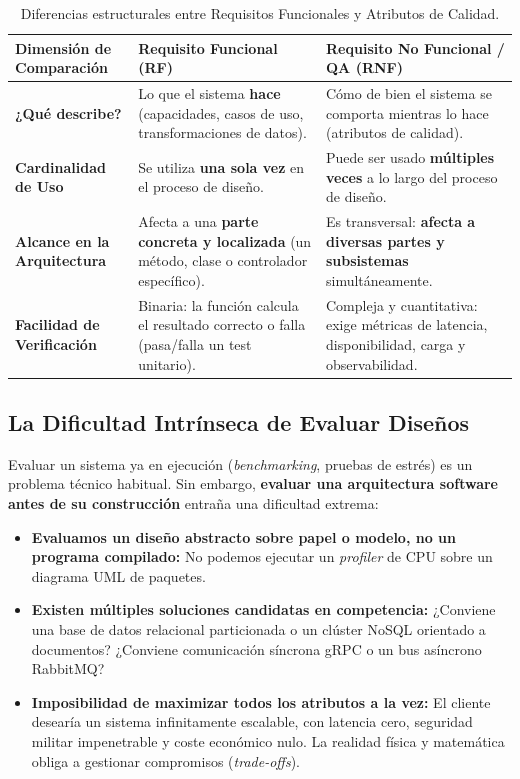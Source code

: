 \begin{table}[htbp]
\centering
\small
\begin{tabularx}{\textwidth}{p{4.5cm} X X}
\toprule
\textbf{Dimensión de Comparación} & \textbf{Requisito Funcional (RF)} & \textbf{Requisito No Funcional / QA (RNF)} \\
\midrule
\textbf{¿Qué describe?} & Lo que el sistema \textbf{hace} (capacidades, casos de uso, transformaciones de datos). & Cómo de bien el sistema se comporta mientras lo hace (atributos de calidad). \\
\addlinespace
\textbf{Cardinalidad de Uso} & Se utiliza \textbf{una sola vez} en el proceso de diseño. & Puede ser usado \textbf{múltiples veces} a lo largo del proceso de diseño. \\
\addlinespace
\textbf{Alcance en la Arquitectura} & Afecta a una \textbf{parte concreta y localizada} (un método, clase o controlador específico). & Es transversal: \textbf{afecta a diversas partes y subsistemas} simultáneamente. \\
\addlinespace
\textbf{Facilidad de Verificación} & Binaria: la función calcula el resultado correcto o falla (pasa/falla un test unitario). & Compleja y cuantitativa: exige métricas de latencia, disponibilidad, carga y observabilidad. \\
\bottomrule
\end{tabularx}
\caption{Diferencias estructurales entre Requisitos Funcionales y Atributos de Calidad.}
\label{tab:rf-vs-rnf}
\end{table}

\subsection{La Dificultad Intrínseca de Evaluar Diseños}

Evaluar un sistema ya en ejecución (\emph{benchmarking}, pruebas de estrés) es un problema técnico habitual. Sin embargo, \textbf{evaluar una arquitectura software antes de su construcción} entraña una dificultad extrema:
\begin{itemize}[leftmargin=1.5em]
  \item \textbf{Evaluamos un diseño abstracto sobre papel o modelo, no un programa compilado:} No podemos ejecutar un \emph{profiler} de CPU sobre un diagrama UML de paquetes.
  \item \textbf{Existen múltiples soluciones candidatas en competencia:} ¿Conviene una base de datos relacional particionada o un clúster NoSQL orientado a documentos? ¿Conviene comunicación síncrona gRPC o un bus asíncrono RabbitMQ?
  \item \textbf{Imposibilidad de maximizar todos los atributos a la vez:} El cliente desearía un sistema infinitamente escalable, con latencia cero, seguridad militar impenetrable y coste económico nulo. La realidad física y matemática obliga a gestionar compromisos (\emph{trade-offs}).
\end{itemize}

